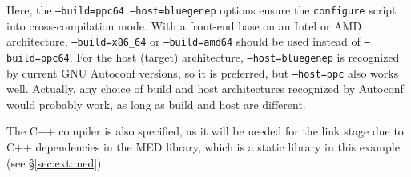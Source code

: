 \documentclass[a4paper,10pt,twoside]{csshortdoc}
\begin{document}

Here, the \texttt{--build=ppc64 --host=bluegenep} options ensure the
\texttt{configure} script into cross-compilation mode.
With a front-end base on an Intel or AMD architecture,
\texttt{--build=x86\_64} or \texttt{--build=amd64} should be used
instead of \texttt{--build=ppc64}. For the host (target) architecture,
\texttt{--host=bluegenep} is recognized by current GNU Autoconf versions,
so it is preferred, but \texttt{--host=ppc} also works well. Actually,
any choice of build and host architectures recognized by Autoconf would
probably work, as long as build and host are different.

The C++ compiler is also specified, as it will be needed for
the link stage due to C++ dependencies in the MED library,
which is a static library in this example (see \S\ref{sec:ext:med}).
\end{document}
